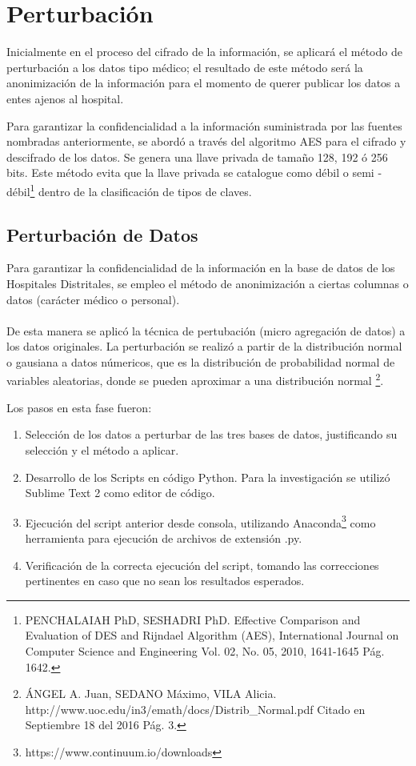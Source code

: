 \documentclass[a4paper,openright,12pt]{book}
\theoremstyle{definition}
\theoremstyle{remark}
\begin{document}
\section{Perturbación}
Inicialmente en el proceso del cifrado de la información, se aplicará el método de perturbación a los datos tipo médico; el resultado de este método será la anonimización de la información para el momento de querer publicar los datos a entes ajenos al hospital.

Para garantizar la confidencialidad a la información suministrada por las fuentes nombradas anteriormente, se abordó a través del algoritmo AES para el cifrado y descifrado de los datos. Se genera una llave privada de tamaño 128, 192 ó 256 bits. Este método evita que la llave privada se catalogue como débil o semi - débil\footnote{PENCHALAIAH PhD, SESHADRI  PhD. Effective Comparison and Evaluation of DES and Rijndael Algorithm (AES), International Journal on Computer Science and Engineering Vol. 02, No. 05, 2010, 1641-1645 Pág. 1642.} dentro de la clasificación de tipos de claves.
    
    \subsection{Perturbación de Datos}
     Para garantizar la confidencialidad de la información en la base de datos de los Hospitales Distritales, se empleo el método de anonimización a ciertas columnas o datos (carácter médico o personal).\\\\ De esta manera se aplicó la técnica de pertubación (micro agregación de datos) a los datos originales. La perturbación se realizó a partir de la distribución normal o gausiana a datos númericos, que es la distribución de probabilidad normal de variables aleatorias, donde se pueden aproximar a una distribución normal \footnote{ÁNGEL A. Juan, SEDANO Máximo, VILA Alicia. http://www.uoc.edu/in3/emath/docs/Distrib\_Normal.pdf Citado en Septiembre 18 del 2016 Pág. 3. }.

Los pasos en esta fase fueron:
\begin{enumerate}
	\item Selección de los datos a perturbar de las tres bases de datos, justificando su selección y el método a aplicar.
    \item Desarrollo de los Scripts en código Python. Para la investigación se utilizó Sublime Text 2 como editor de código.
    \item Ejecución del script anterior desde consola, utilizando Anaconda\footnote{https://www.continuum.io/downloads} como herramienta para ejecución de archivos de extensión .py.
    \item Verificación de la correcta ejecución del script, tomando las correcciones pertinentes en caso que no sean los resultados esperados.
\end{enumerate}
\end{document}
